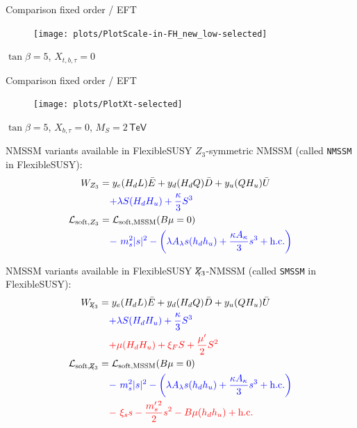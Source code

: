 \documentclass[hyperref={pdfpagelabels=false},ngerman]{beamer}
\newcommand{\eh}[1]{\,\mathsf{#1}}
\newcommand{\Lagr}{\mathcal{L}}
\newcommand{\Zv}{\ensuremath{\backslash\mkern-11.0mu{Z_3}}}
\begin{document}
\begin{frame}{Comparison fixed order / EFT}
  \begin{figure}
    \centering
    \texttt{[image: plots/PlotScale-in-FH\_new\_low-selected]}
  \end{figure}
  $\tan\beta = 5$, $X_{t,b,\tau} = 0$
\end{frame}


\begin{frame}{Comparison fixed order / EFT}
  \begin{figure}
    \centering
    \texttt{[image: plots/PlotXt-selected]}
  \end{figure}
  $\tan\beta = 5$, $X_{b,\tau} = 0$, $M_S = 2\eh{TeV}$
\end{frame}


\begin{frame}{NMSSM variants available in FlexibleSUSY}
  $Z_3$-symmetric NMSSM (called \texttt{NMSSM} in FlexibleSUSY):
  \begin{align*} 
    W_{Z_3} &= y_e (H_d L) \bar{E}
      + y_d (H_d Q) \bar{D}
      + y_u (Q H_u) \bar{U}\\
      &\phantom{={}}
      \textcolor{blue}{+ \lambda S (H_d H_u) + \frac{\kappa}{3}S^{3}} \\
    \Lagr_{\text{soft},Z_3} &= \Lagr_\text{soft,MSSM}(B\mu=0)\\
    &\phantom{={}}
    \textcolor{blue}{ -\ m_s^2|s|^2 
      -\left(\lambda A_\lambda s (h_d h_u)
        + \frac{\kappa A_\kappa}{3} s^3 + \text{h.c.}\right)}
  \end{align*}
\end{frame}

\begin{frame}{NMSSM variants available in FlexibleSUSY}
  $\Zv$-NMSSM (called \texttt{SMSSM} in FlexibleSUSY):
  \begin{align*} 
    W_{\Zv} &= y_e (H_d L) \bar{E}
      + y_d (H_d Q) \bar{D}
      + y_u (Q H_u) \bar{U}\\
      &\phantom{={}}
      \textcolor{blue}{+ \lambda S (H_d H_u) + \frac{\kappa}{3}S^{3}} \\
      &\phantom{={}}
      \textcolor{red}{+ \mu(H_d H_u) + \xi_FS 
      + \frac{\mu^\prime}{2} S^{2}}\\
    \Lagr_{\text{soft},\Zv} &= \Lagr_\text{soft,MSSM}(B\mu=0)\\
    &\phantom{={}}
    \textcolor{blue}{ -\ m_s^2|s|^2 
      -\left(\lambda A_\lambda s (h_d h_u)
        + \frac{\kappa A_\kappa}{3} s^3 + \text{h.c.}\right)}\\
    &\phantom{={}}
    \textcolor{red}{ -\ \xi_s s - \frac{m_s^{\prime \, 2}}{2} s^2
    - B\mu (h_d h_u) + \text{h.c.}}
  \end{align*}
\end{frame}
\end{document}
